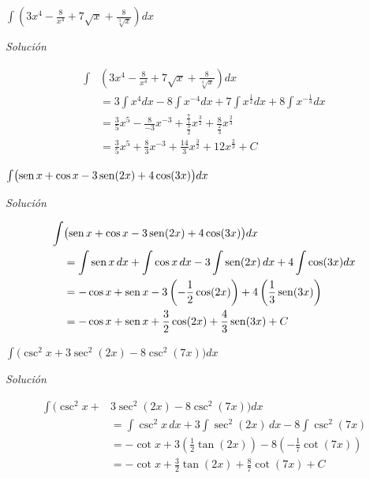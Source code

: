 \begin{parrafonumerado}

\item $\int \left(3x^{4}-\frac{8}{x^{4}}+7\sqrt{x}+\frac{8}{\sqrt[3]{x}}\right)dx$

  \vspace{\parskip}

  \emph{Solución}
  \begin{small}
    \begin{align*}
      \int &\left(3x^{4}-\frac{8}{x^{4}}+7\sqrt{x}+\frac{8}{\sqrt[3]{x}}\right)dx \\
      &=3\int x^{4}dx-8\int x^{-4}dx+7\int x^{\frac{1}{2}}dx+8\int x^{-\frac{1}{3}}dx \\
      &=\frac{3}{5}x^{5}-\frac{8}{-3}x^{-3}+\frac{\frac{7}{1}}{\frac{3}{2}}x^{\frac{
      3}{2}}+\frac{8}{\frac{2}{3}}x^{\frac{2}{3}} \\
      &=\frac{3}{5}x^{5}+\frac{8}{3}x^{-3}+\frac{14}{3}x^{\frac{3}{2}}+12x^{\frac{2}{3}}+C
    \end{align*}
  \end{small}

\item $\int \bigl(\operatorname{sen} x+\cos x-3\operatorname{sen} (2x)+4\cos (3x)\bigr)dx$

  \vspace{\parskip}

  \emph{Solución}
  \begin{small}
    \begin{align*}
      \int &\bigl(\operatorname{sen} x+\cos x-3\operatorname{sen} (2x)+4\cos (3x)\bigr)dx\\
      &=\int \operatorname{sen} x\,dx+\int \cos x\,dx-3\int \operatorname{sen} (2x)\,dx+4\int \cos (3x)dx\\
      &=-\cos x+\operatorname{sen} x-3\left(-\frac{1}{2}\cos (2x)\right)+4\left(\frac{1}{3}\operatorname{sen} (3x)\right)\\
      &=-\cos x+\operatorname{sen} x+\frac{3}{2}\cos (2x)+\frac{4}{3}\operatorname{sen} (3x)+C
    \end{align*}
  \end{small}

  \enlargethispage*{\baselineskip}

\item $\int \bigl(\csc ^{2}x+3\sec ^{2}(2x)-8\csc ^{2}(7x)\bigr)dx$

  \vspace{\parskip}

  \emph{Solución}
  \begin{small}
    \begin{align*}
      \int \bigl(\csc ^{2}x+&3\sec ^{2}(2x)-8\csc ^{2}(7x)\bigr)dx\\
      &= \int \csc ^{2}x\,dx+3\int \sec ^{2}(2x)\,dx-8\int \csc ^{2}(7x)\\
      &=-\cot x+3\left(\frac{1}{2}\tan (2x)\right)-8\left(-\frac{1}{7}\cot (7x)\right)\\
      &=-\cot x+\frac{3}{2}\tan (2x)+\frac{8}{7}\cot (7x)+C
    \end{align*}
  \end{small}


\end{parrafonumerado}
